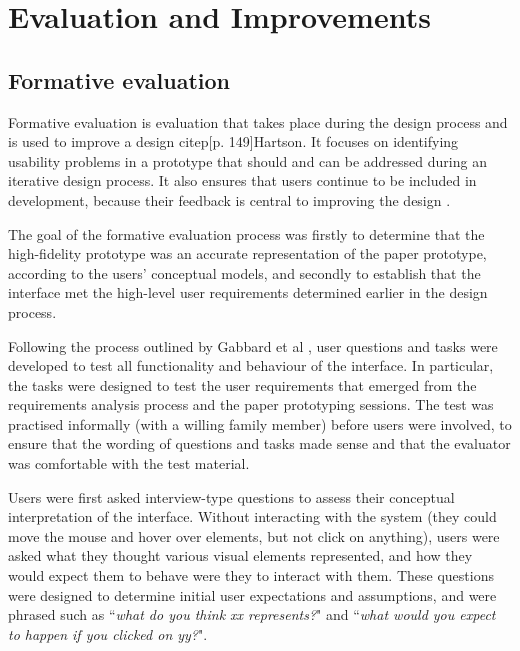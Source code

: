 
\chapter{Evaluation and Improvements} %

\label{Evaluation and Improvements} %




\section{Formative evaluation}
Formative evaluation is evaluation that takes place during the design process and is used to improve a design citep[p. 149]{Hartson}. It focuses on identifying usability problems in a prototype that should and can be addressed during an iterative design process. It also ensures that users continue to be included in development, because their feedback is central to improving the design \citep{GabbardHix}. 

The goal of the formative evaluation process was firstly to determine that the high-fidelity prototype was an accurate representation of the paper prototype, according to the users' conceptual models, and secondly to establish that the interface met the high-level user requirements determined earlier in the design process.

Following the process outlined by Gabbard et al  \citep{GabbardHix}, user questions and tasks were developed to test all functionality and behaviour of the interface. In particular, the tasks were designed to test the user requirements that emerged from the requirements analysis process and the paper prototyping sessions. The test was practised informally (with a willing family member) before users were involved, to ensure that the wording of questions and tasks made sense and that the evaluator was comfortable with the test material.

Users were first asked interview-type questions to assess their conceptual interpretation of the interface. Without interacting with the system (they could move the mouse and hover over elements, but not click on anything), users were asked what they thought various visual elements represented, and how they would expect them to behave were they to interact with them. These questions were designed to determine initial user expectations and assumptions, and were phrased such as ``\textit{what do you think xx represents?}" and ``\textit{what would you expect to happen if you clicked on yy?}". 

